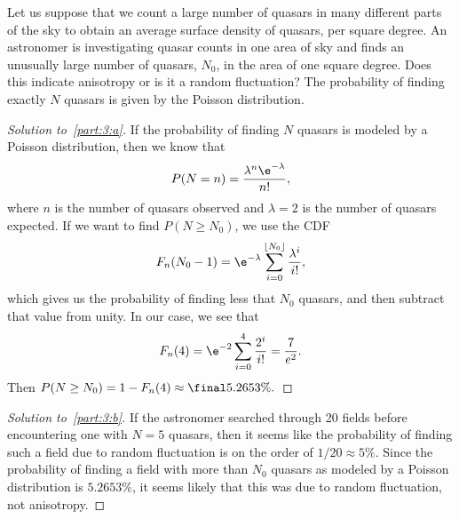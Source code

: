 \documentclass[10pt, physics]{homework}
\begin{document}
	\begin{problem}[4pts]
		Let us suppose that we count a large number of quasars in many different parts of the sky to obtain an average surface density of quasars, per square degree. An astronomer is investigating quasar counts in one area of sky and finds an unusually large number of quasars, $N_0$, in the area of one square degree. Does this indicate anisotropy or is it a random fluctuation? The probability of finding exactly $N$ quasars is given by the Poisson distribution. 
	\end{problem}
	\begin{proof}[Solution to~\ref{part:3:a}]
		If the probability of finding $N$ quasars is modeled by a Poisson distribution, then we know that
		\[ P(N = n) = \frac{\lambda^n \e^{-\lambda}}{n!}, \]
		where $n$ is the number of quasars observed and $\lambda = 2$ is the number of quasars expected.
		If we want to find $P(N \geq N_0)$, we use the CDF
		\[ F_n({N_0-1}) = \e^{-\lambda} \sum_{i=0}^{\lfloor N_0 \rfloor} \frac{\lambda^i}{i!}, \]
		which gives us the probability of finding less that $N_0$ quasars, and then subtract that value from unity.
		In our case, we see that 
		\[ F_n(4) = \e^{-2}\sum_{i = 0}^4 \frac{2^i}{i!} = \frac{7}{e^2}. \]
		Then $P(N \geq N_0) = 1 - F_n(4) \approx \final{5.2653\%.}$
	\end{proof}
	\begin{proof}[Solution to~\ref{part:3:b}]
		If the astronomer searched through 20 fields before encountering one with $N = 5$ quasars, then it seems like the probability of finding such a field due to random fluctuation is on the order of $1/20 \approx 5\%$.
		Since the probability of finding a field with more than $N_0$ quasars as modeled by a Poisson distribution is $5.2653\%$, it seems likely that this was due to random fluctuation, not anisotropy.
	\end{proof}
\end{document}
